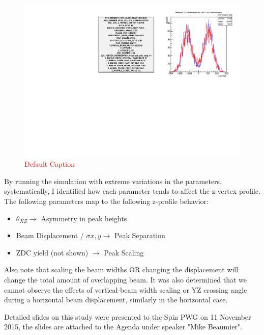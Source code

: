 \begin{figure}
\begin{center}
\includegraphics[width=\linewidth,height=\textheight,keepaspectratio]{./figures/359711_step14_config_compare}
\caption{ 
\textcolor{red}{Default Caption}
}
\label{fig:359711_step14_config_compare}
\end{center}
\end{figure}
\clearpage

By running the simulation with extreme variations in the parameters,
systematically, I identified how each parameter tends to affect the z-vertex
profile. The following parameters map to the following z-profile behavior:
\begin{itemize}
  \item $\theta_{XZ} \rightarrow$ Asymmetry in peak heights
  \item Beam Displacement / $\sigma{x,y} \rightarrow$ Peak Separation
  \item ZDC yield (not shown) $\rightarrow$ Peak Scaling
\end{itemize}

Also note that scaling the beam widths OR changing the displacement will change
the total amount of overlapping beam. It was also determined that we cannot
observe the effects of vertical-beam width scaling or YZ crossing angle during a
horizontal beam displacement, similarly in the horizontal case.

Detailed slides on this study were presented to the Spin PWG on 11 November
2015, the slides are attached to the Agenda under speaker "Mike Beaumier".
